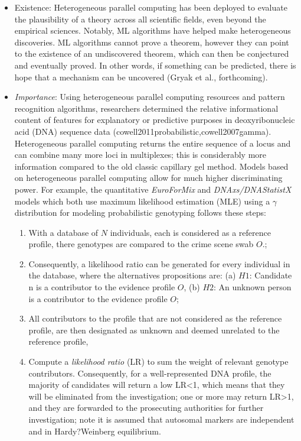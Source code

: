 \documentclass[10pt]{article}[draft]
\begin{document}
\begin{itemize}
	\item Existence: Heterogeneous parallel computing  has been deployed to evaluate the plausibility of a theory across all scientific fields, even beyond the empirical sciences. Notably, ML algorithms have helped make heterogeneous discoveries. ML algorithms cannot prove a theorem, however they can point to the existence of an undiscovered theorem, which can then be conjectured and eventually proved. In other words, if something can be predicted, there is hope that a mechanism can be uncovered (Gryak et al., forthcoming).
	
	\item  \emph{Importance}: Using heterogeneous parallel computing resources and pattern recognition algorithms, researchers  determined the relative informational content of features for explanatory or predictive purposes in  deoxyribonucleic acid  (DNA) sequence data (cowell2011probabilistic,cowell2007gamma). Heterogeneous parallel computing returns the entire sequence of a locus and can combine many more loci in multiplexes; this is considerably more information  compared to the old classic capillary gel method. Models based on heterogeneous parallel computing allow for much higher discriminating power. For example, the  quantitative \emph{EuroForMix} and \emph{DNAxs/DNAStatistX}  models which both use maximum likelihood estimation (MLE) using a $\gamma$ distribution for modeling probabilistic genotyping follows these steps:
	\begin{enumerate} 
		\item  With a database of $N$ individuals, each is considered as a  reference profile, there genotypes are compared to the crime scene swab $O$.; 
		\item Consequently, a likelihood ratio can be generated for every individual in the database, where the alternatives propositions are:  (a) $H1$: Candidate n is a contributor to the evidence profile $O$, (b) $H2$: An unknown person is a contributor to the evidence profile $O$;  
		\item All contributors to the profile that are not  considered as the reference profile, are then designated as unknown and deemed unrelated to the reference profile, 
		\item  Compute a \emph{likelihood ratio} (LR) to sum the weight of relevant genotype contributors. Consequently, for a well-represented DNA profile, the majority of candidates will return a low LR<1, which means that they will be eliminated from the investigation; one or more may return LR>1, and they are forwarded to the prosecuting authorities for further investigation; note it is assumed that autosomal markers are independent and in Hardy?Weinberg equilibrium. 
\end{enumerate}


\end{itemize}
\end{document}
